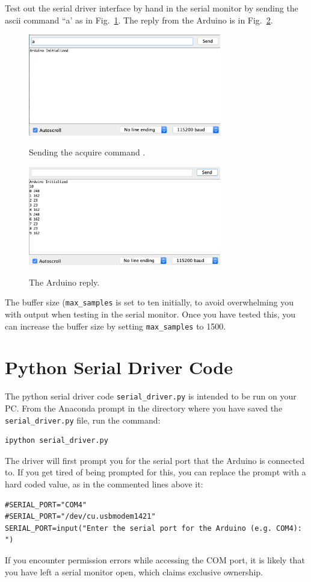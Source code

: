 \documentclass[12pt]{article}
\begin{document}
Test out the serial driver interface by hand in the serial monitor by sending the ascii command ``a' as in Fig.~\ref{fig:send}.  The reply from the Arduino is in  Fig.~\ref{fig:reply}.
\begin{figure}[ht bp]
\begin{center}
{\includegraphics[width=0.75\textwidth]{figs/send.png}}
\end{center}
\caption{\label{fig:send} Sending the acquire command .}
\end{figure}
\begin{figure}[htbp]
\begin{center}
{\includegraphics[width=0.75\textwidth]{figs/reply.png}}
\end{center}
\caption{\label{fig:reply} The Arduino reply.}
\end{figure}
The buffer size ({\tt max\_samples} is set to ten initially, to avoid overwhelming you with output when testing in the serial monitor.  Once you have tested this, you can increase the buffer size by setting {\tt max\_samples} to 1500. 

\section{Python Serial Driver Code}
The python serial driver code {\tt serial\_driver.py} is intended to be run on your PC.  From the Anaconda prompt in the directory where you have saved the {\tt serial\_driver.py} file, run the command:
\begin{verbatim}
ipython serial_driver.py
\end{verbatim}
The driver will first prompt you for the serial port that the Arduino is connected to.  If you get tired of being prompted for this, you can replace the prompt with a hard coded value, as in the commented lines above it:
\begin{verbatim}
#SERIAL_PORT="COM4"
#SERIAL_PORT="/dev/cu.usbmodem1421"
SERIAL_PORT=input("Enter the serial port for the Arduino (e.g. COM4):  ")
\end{verbatim}
If you encounter permission errors while accessing the COM port, it is likely that you have left a serial monitor open, which claims exclusive ownership.
\end{document}
